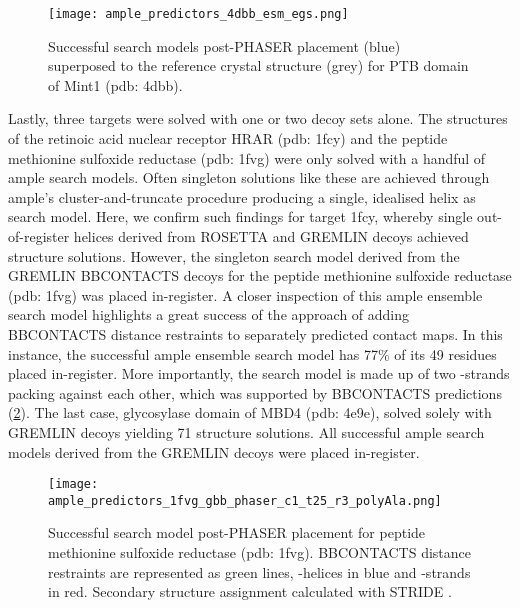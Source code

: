 \begin{figure}[H]
    \centering
    \texttt{[image: ample\_predictors\_4dbb\_esm\_egs.png]}
    \caption{Successful search models post-PHASER placement (blue) superposed to the reference crystal structure (grey) for PTB domain of Mint1 (\gls{pdb}: 4dbb).}
    \label{fig:ample_predictors_4dbb_esm_egs}
\end{figure}

Lastly, three targets were solved with one or two decoy sets alone. The structures of the retinoic acid nuclear receptor HRAR (\gls{pdb}: 1fcy) and the peptide methionine sulfoxide reductase (\gls{pdb}: 1fvg) were only solved with a handful of \gls{ample} search models. Often singleton solutions like these are achieved through \gls{ample}’s cluster-and-truncate procedure producing a single, idealised helix as search model. Here, we confirm such findings for target 1fcy, whereby single out-of-register helices derived from ROSETTA and GREMLIN decoys achieved structure solutions. However, the singleton search model derived from the GREMLIN BBCONTACTS decoys for the peptide methionine sulfoxide reductase (\gls{pdb}: 1fvg) was placed in-register. A closer inspection of this \gls{ample} ensemble search model highlights a great success of the approach of adding BBCONTACTS distance restraints to separately predicted contact maps. In this instance, the successful \gls{ample} ensemble search model has 77\% of its 49 residues placed in-register. More importantly, the search model is made up of two \textbeta-strands packing against each other, which was supported by BBCONTACTS predictions (\cref{fig:ample_predictors_1fvg_gbb_phaser_c1_t25_r3_polyAla}). The last case, glycosylase domain of MBD4 (\gls{pdb}: 4e9e), solved solely with GREMLIN decoys yielding 71 structure solutions. All successful \gls{ample} search models derived from the GREMLIN decoys were placed in-register.

\begin{figure}[H]
    \centering
    \texttt{[image: ample\_predictors\_1fvg\_gbb\_phaser\_c1\_t25\_r3\_polyAla.png]}
    \caption{Successful search model post-PHASER placement for peptide methionine sulfoxide reductase (\gls{pdb}: 1fvg). BBCONTACTS distance restraints are represented as green lines, \textalpha-helices in blue and \textbeta-strands in red. Secondary structure assignment calculated with STRIDE \cite{Frishman1995-ns}.}
    \label{fig:ample_predictors_1fvg_gbb_phaser_c1_t25_r3_polyAla}
\end{figure}

